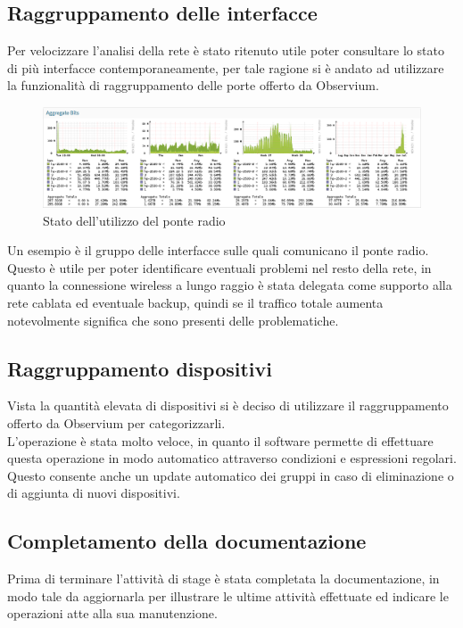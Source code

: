 \documentclass[Realizzazione.tex]{subfiles}
\begin{document}
\newpage
\subsection{Raggruppamento delle interfacce}
Per velocizzare l'analisi della rete è stato ritenuto utile poter consultare lo stato di più interfacce contemporaneamente, per tale ragione si è andato ad utilizzare la funzionalità di raggruppamento delle porte offerto da Observium.

\begin{figure}[H]
	\centering
	\includegraphics[width=1\linewidth]{"images/trafficoponteradio"}
	\caption{Stato dell'utilizzo del ponte radio}
	\label{fig:Stato dell'utilizzo del ponte radio}
\end{figure}

Un esempio è il gruppo delle interfacce sulle quali comunicano il ponte radio. Questo è utile per poter identificare eventuali problemi nel resto della rete, in quanto la connessione wireless a lungo raggio è stata delegata come supporto alla rete cablata ed eventuale backup, quindi se il traffico totale aumenta notevolmente significa che sono presenti delle problematiche.


\subsection{Raggruppamento dispositivi}
Vista la quantità elevata di dispositivi si è deciso di utilizzare il raggruppamento offerto da Observium per categorizzarli. \\
L'operazione è stata molto veloce, in quanto il software permette di effettuare questa operazione in modo automatico attraverso condizioni e espressioni regolari. Questo consente anche un update automatico dei gruppi in caso di eliminazione o di aggiunta di nuovi dispositivi.

\subsection{Completamento della documentazione}
Prima di terminare l'attività di stage è stata completata la documentazione, in modo tale da aggiornarla per illustrare le ultime attività effettuate ed indicare le operazioni atte alla sua manutenzione.
\end{document}
